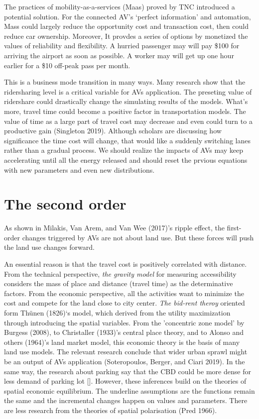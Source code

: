 \documentclass[12pt,]{article}
\begin{document}
The practices of mobility-as-a-services (Maas) proved by TNC introduced
a potential solution. For the connected AV's `perfect information' and
automation, Mass could largely reduce the opportunity cost and
transaction cost, then could reduce car ownership. Moreover, It provdes
a series of options by monetized the values of reliability and
flexibility. A hurried passenger may will pay \$100 for arriving the
airport as soon as possible. A worker may will get up one hour earlier
for a \$10 off-peak pass per month.

This is a business mode transition in many ways. Many research show that
the ridersharing level is a critical variable for AVs application. The
preseting value of ridershare could drastically change the simulating
results of the models. What's more, travel time could become a positive
factor in transportation models. The value of time as a large part of
travel cost may decrease and even could turn to a productive gain
(Singleton 2019). Although scholars are discussing how significance the
time cost will change, that would like a suddenly switching lanes rather
than a gradual process. We should realize the impacts of AVs may keep
accelerating until all the energy released and should reset the prvious
equations with new parameters and even new distributions.

\hypertarget{the-second-order}{%
\section{The second order}\label{the-second-order}}

As shown in Milakis, Van Arem, and Van Wee (2017)'s ripple effect, the
first-order changes triggered by AVs are not about land use. But these
forces will push the land use changes forward.

An essential reason is that the travel cost is positively correlated
with distance. From the technical perspective, \emph{the gravity model}
for measuring accessibility considers the mass of place and distance
(travel time) as the determinative factors. From the economic
perspective, all the activities want to minimize the cost and compete
for the land close to city center. \emph{The bid-rent theroy} oriented
form Thünen (1826)`s model, which derived from the utility maximization
through introducing the spatial variables. From the 'concentric zone
model' by Burgess (2008), to Christaller (1933)'s central place theory,
and to Alonso and others (1964)'s land market model, this economic
theory is the basis of many land use models. The relevant research
conclude that wider urban sprawl might be an output of AVs application
(Soteropoulos, Berger, and Ciari 2019). In the same way, the research
about parking say that the CBD could be more dense for less demand of
parking lot {[}{]}. However, these inferences build on the theories of
spatial economic equilibrium. The underline assumptions are the
functions remain the same and the incremental changes happen on values
and parameters. There are less research from the theories of spatial
polarisation (Pred 1966).
\end{document}
